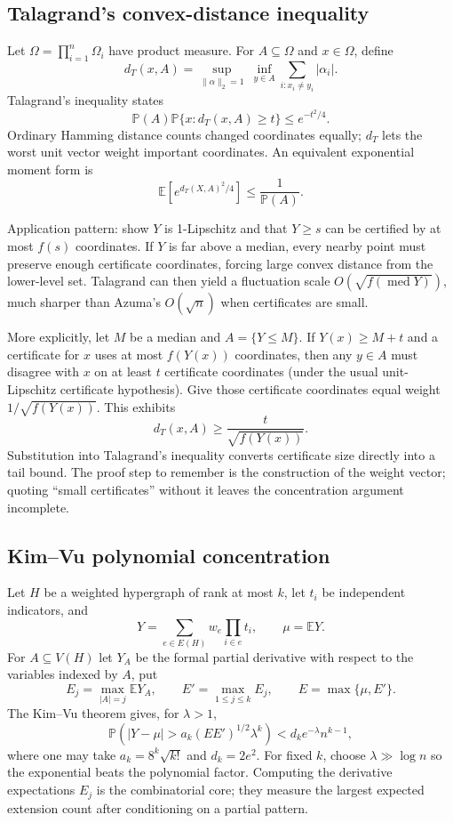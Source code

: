 \documentclass[10pt]{article}
\newcommand{\E}{\mathbb E}
\newcommand{\Prb}{\mathbb P}
\newcommand{\1}{\mathbf 1}
\begin{document}
\subsection{Talagrand's convex-distance inequality}

Let $\Omega=\prod_{i=1}^n\Omega_i$ have product measure.  For $A\subseteq\Omega$
and $x\in\Omega$, define
\[
 d_T(x,A)=\sup_{\|\alpha\|_2=1}\ 
 \inf_{y\in A}\sum_{i:x_i\neq y_i}|\alpha_i|.
\]
Talagrand's inequality states
\[
 \Prb(A)\Prb\{x:d_T(x,A)\geq t\}\leq e^{-t^2/4}.        \tag{Talagrand}
\]
Ordinary Hamming distance counts changed coordinates equally; $d_T$ lets the
worst unit vector weight important coordinates.  An equivalent exponential
moment form is
\[
 \E\!\left[e^{d_T(X,A)^2/4}\right]\leq\frac1{\Prb(A)}.
\]

Application pattern: show $Y$ is 1-Lipschitz and that $Y\geq s$ can be certified
by at most $f(s)$ coordinates.  If $Y$ is far above a median, every nearby point
must preserve enough certificate coordinates, forcing large convex distance
from the lower-level set.  Talagrand can then yield a fluctuation scale
$O(\sqrt{f(\operatorname{med}Y)})$, much sharper than Azuma's
$O(\sqrt n)$ when certificates are small.

More explicitly, let $M$ be a median and $A=\{Y\leq M\}$.  If $Y(x)\geq M+t$
and a certificate for $x$ uses at most $f(Y(x))$ coordinates, then any $y\in A$
must disagree with $x$ on at least $t$ certificate coordinates (under the usual
unit-Lipschitz certificate hypothesis).  Give those certificate coordinates equal
weight $1/\sqrt{f(Y(x))}$.  This exhibits
\[
 d_T(x,A)\geq \frac{t}{\sqrt{f(Y(x))}}.
\]
Substitution into Talagrand's inequality converts certificate size directly into a
tail bound.  The proof step to remember is the construction of the weight vector;
quoting ``small certificates'' without it leaves the concentration argument incomplete.

\subsection{Kim--Vu polynomial concentration}

Let $H$ be a weighted hypergraph of rank at most $k$, let $t_i$ be independent
indicators, and
\[
 Y=\sum_{e\in E(H)}w_e\prod_{i\in e}t_i,\qquad \mu=\E Y.
\]
For $A\subseteq V(H)$ let $Y_A$ be the formal partial derivative with respect to
the variables indexed by $A$, put
\[
 E_j=\max_{|A|=j}\E Y_A,\qquad
 E'=\max_{1\leq j\leq k}E_j,\qquad E=\max\{\mu,E'\}.
\]
The Kim--Vu theorem gives, for $\lambda>1$,
\[
 \Prb\!\left(|Y-\mu|>a_k(EE')^{1/2}\lambda^k\right)
 <d_k e^{-\lambda}n^{k-1},                            \tag{Kim--Vu}
\]
where one may take $a_k=8^k\sqrt{k!}$ and $d_k=2e^2$.
For fixed $k$, choose $\lambda\gg\log n$ so the exponential beats the polynomial
factor.  Computing the derivative expectations $E_j$ is the combinatorial core;
they measure the largest expected extension count after conditioning on a
partial pattern.
\end{document}
